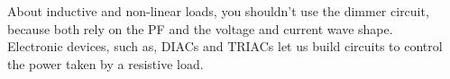 \documentclass[journal]{IEEEtran}
\begin{document}
About inductive and non-linear loads, you shouldn't use 
the dimmer circuit, because both rely on the PF and the
voltage and current wave shape.\\

Electronic devices, such as,
DIACs and TRIACs let us build circuits to control the 
power taken by a resistive load.\\

\end{document}
